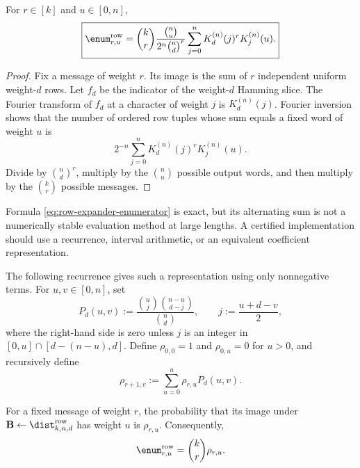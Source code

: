 \begin{lemma}
\label{lem:row-expander-enumerator}
For $r\in[k]$ and $u\in[0,n]$,
\begin{equation}
 \boxed{
 \enum^{\mathrm{row}}_{r,u}
   =
 \binom{k}{r}\frac{\binom{n}{u}}{2^n\binom{n}{d}^{r}}
 \sum_{j=0}^{n}K_d^{(n)}(j)^r K_j^{(n)}(u).
 }
 \label{eq:row-expander-enumerator}
\end{equation}
\end{lemma}

\begin{proof}
Fix a message of weight $r$.  Its image is the sum of $r$ independent uniform
weight-$d$ rows.  Let $f_d$ be the indicator of the weight-$d$ Hamming slice.
The Fourier transform of $f_d$ at a character of weight $j$ is
$K_d^{(n)}(j)$.  Fourier inversion shows that the number of ordered row tuples
whose sum equals a fixed word of weight $u$ is
\[
 2^{-n}\sum_{j=0}^{n}K_d^{(n)}(j)^r K_j^{(n)}(u).
\]
Divide by $\binom{n}{d}^r$, multiply by the $\binom{n}{u}$ possible output
words, and then multiply by the $\binom{k}{r}$ possible messages.
\end{proof}

Formula \eqref{eq:row-expander-enumerator} is exact, but its alternating sum is
not a numerically stable evaluation method at large lengths.  A certified
implementation should use a recurrence, interval arithmetic, or an equivalent
coefficient representation.

The following recurrence gives such a representation using only nonnegative
terms.  For $u,v\in[0,n]$, set
\begin{equation}
 P_d(u,v)
 :=
 \frac{\binom{u}{j}\binom{n-u}{d-j}}{\binom{n}{d}},
 \qquad
 j:=\frac{u+d-v}{2},
 \label{eq:row-shell-transition}
\end{equation}
where the right-hand side is zero unless $j$ is an integer in
$[0,u]\cap[d-(n-u),d]$.  Define $\rho_{0,0}=1$ and
$\rho_{0,u}=0$ for $u>0$, and recursively define
\begin{equation}
 \rho_{r+1,v}:=\sum_{u=0}^{n}\rho_{r,u}P_d(u,v).
 \label{eq:row-shell-recurrence}
\end{equation}

\begin{lemma}
\label{lem:row-shell-recurrence}
For a fixed message of weight $r$, the probability that its image under
$\B\gets\dist^{\mathrm{row}}_{k,n,d}$ has weight $u$ is $\rho_{r,u}$.
Consequently,
\begin{equation}
 \enum^{\mathrm{row}}_{r,u}=\binom{k}{r}\rho_{r,u}.
 \label{eq:row-expander-positive-enumerator}
\end{equation}
\end{lemma}

